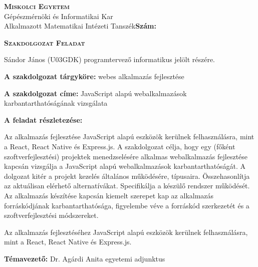 \begin{flushleft}
\textsc{\bfseries Miskolci Egyetem}\\
Gépészmérnöki és Informatikai Kar\\
Alkalmazott Matematikai Intézeti Tanszék\hspace*{4cm}\hfil \textbf{Szám:}
\end{flushleft}
\vskip 0.5cm
\begin{center}
\large\textsc{\bfseries Szakdolgozat Feladat}
\end{center}
\vskip 0.5cm
Sándor János (U03GDK) programtervező informatikus jelölt részére.\newline

\noindent\textbf{A szakdolgozat tárgyköre:} webes alkalmazás fejlesztése\newline

\noindent\textbf{A szakdolgozat címe:} JavaScript alapú webalkalmazások karbantarthatóságának vizsgálata\newline

\noindent\textbf{A feladat részletezése:}

\medskip

\begin{itshape}
Az alkalmazás fejlesztése JavaScript alapú eszközök kerülnek felhasználásra, mint a React, React Native és Express.js. A szakdolgozat célja, hogy egy (főként szoftverfejlesztési) projektek menedzselésére alkalmas webalkalmazás fejlesztése kapcsán vizsgálja a JavaScript alapú webalkalmazások karbantarthatóságát. A dolgozat kitér a projekt kezelés általános működésére, típusaira. Összehasonlítja az aktuálisan elérhető alternatívákat. Specifikálja a készülő rendszer működését. Az alkalmazás készítése kapcsán kiemelt szerepet kap az alkalmazás forráskódjának karbantarthatósága, figyelembe véve a forráskód szerkezetét és a szoftverfejlesztési módszereket.

Az alkalmazás fejlesztéséhez JavaScript alapú eszközök kerülnek felhasználásra, mint a React, React Native és Express.js.
\end{itshape}

\medskip

\vfill

\noindent\textbf{Témavezető:} Dr. Agárdi Anita egyetemi adjunktus \newline


